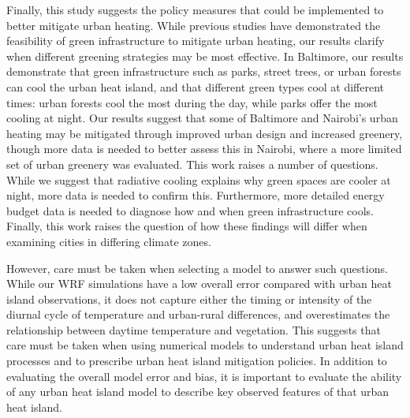 Finally, this study suggests the policy measures that could be implemented to better mitigate urban heating. While previous studies have demonstrated the feasibility of green infrastructure to mitigate urban heating, our results clarify when different greening strategies may be most effective.
In Baltimore, our results demonstrate that green infrastructure such as parks, street trees, or urban forests can cool the urban heat island, and that different green types cool at different times: urban forests cool the most during the day, while parks offer the most cooling at night. 
Our results suggest that some of Baltimore and Nairobi's urban heating may be mitigated through improved urban design and increased greenery, though more data is needed to better assess this in Nairobi, where a more limited set of urban greenery was evaluated. 
This work raises a number of questions. 
While we suggest that radiative cooling explains why green spaces are cooler at night, more data is needed to confirm this. Furthermore, more detailed energy budget data is needed to diagnose how and when green infrastructure cools. Finally, this work raises the question of how these findings will differ when examining cities in differing climate zones. 

However, care must be taken when selecting a model to answer such questions. 
While our WRF simulations have a low overall error compared with urban heat island observations, it does not capture either the timing or intensity of the diurnal cycle of temperature and urban-rural differences, and overestimates the relationship between daytime temperature and vegetation. This suggests that care must be taken when using numerical models to understand urban heat island processes and to prescribe urban heat island mitigation policies. In addition to evaluating the overall model error and bias, it is important to evaluate the ability of any urban heat island model to describe key observed features of that urban heat island. 

